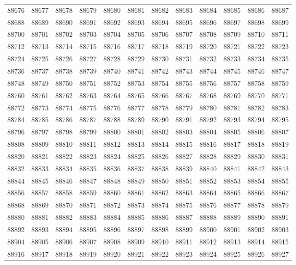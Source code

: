 \begin{center}
\begin{longtable}{llllllllllll}
88676 &88677 &88678 &88679 &88680 &88681 &88682 &88683 &88684 &88685 &88686 &88687 \\
88688 &88689 &88690 &88691 &88692 &88693 &88694 &88695 &88696 &88697 &88698 &88699 \\
88700 &88701 &88702 &88703 &88704 &88705 &88706 &88707 &88708 &88709 &88710 &88711 \\
88712 &88713 &88714 &88715 &88716 &88717 &88718 &88719 &88720 &88721 &88722 &88723 \\
88724 &88725 &88726 &88727 &88728 &88729 &88730 &88731 &88732 &88733 &88734 &88735 \\
88736 &88737 &88738 &88739 &88740 &88741 &88742 &88743 &88744 &88745 &88746 &88747 \\
88748 &88749 &88750 &88751 &88752 &88753 &88754 &88755 &88756 &88757 &88758 &88759 \\
88760 &88761 &88762 &88763 &88764 &88765 &88766 &88767 &88768 &88769 &88770 &88771 \\
88772 &88773 &88774 &88775 &88776 &88777 &88778 &88779 &88780 &88781 &88782 &88783 \\
88784 &88785 &88786 &88787 &88788 &88789 &88790 &88791 &88792 &88793 &88794 &88795 \\
88796 &88797 &88798 &88799 &88800 &88801 &88802 &88803 &88804 &88805 &88806 &88807 \\
88808 &88809 &88810 &88811 &88812 &88813 &88814 &88815 &88816 &88817 &88818 &88819 \\
88820 &88821 &88822 &88823 &88824 &88825 &88826 &88827 &88828 &88829 &88830 &88831 \\
88832 &88833 &88834 &88835 &88836 &88837 &88838 &88839 &88840 &88841 &88842 &88843 \\
88844 &88845 &88846 &88847 &88848 &88849 &88850 &88851 &88852 &88853 &88854 &88855 \\
88856 &88857 &88858 &88859 &88860 &88861 &88862 &88863 &88864 &88865 &88866 &88867 \\
88868 &88869 &88870 &88871 &88872 &88873 &88874 &88875 &88876 &88877 &88878 &88879 \\
88880 &88881 &88882 &88883 &88884 &88885 &88886 &88887 &88888 &88889 &88890 &88891 \\
88892 &88893 &88894 &88895 &88896 &88897 &88898 &88899 &88900 &88901 &88902 &88903 \\
88904 &88905 &88906 &88907 &88908 &88909 &88910 &88911 &88912 &88913 &88914 &88915 \\
88916 &88917 &88918 &88919 &88920 &88921 &88922 &88923 &88924 &88925 &88926 &88927 \\

\end{longtable}
\end{center}
